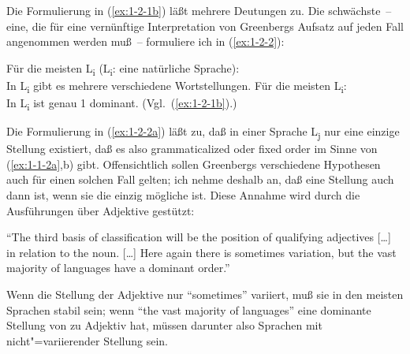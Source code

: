\documentclass[output=paper]{langsci/langscibook}
\begin{document}
Die Formulierung in (\ref{ex:1-2-1b}) läßt mehrere Deutungen zu. Die schwächste~-- eine, die
für eine vernünftige Interpretation von Greenbergs Aufsatz auf jeden Fall angenommen werden muß~– formuliere ich in (\ref{ex:1-2-2}):
\begin{exe}
\ex\label{ex:1-2-2}
\begin{xlist}
\ex\label{ex:1-2-2a} Für die meisten L\textsubscript{i} (L\textsubscript{i}: eine natürliche Sprache): \\
In L\textsubscript{i} gibt es mehrere verschiedene Wortstellungen.
\ex\label{ex:1-2-2b} Für die meisten L\textsubscript{i}: \\
In L\textsubscript{i} ist genau 1  dominant. (Vgl.\ (\ref{ex:1-2-1b}).)
\end{xlist}
\end{exe}
Die Formulierung in (\ref{ex:1-2-2a}) läßt zu, daß in einer Sprache L\textsubscript{j} nur eine einzige Stellung existiert, daß es also grammaticalized oder fixed order im Sinne von (\ref{ex:1-1-2a},b) gibt. Offensichtlich sollen Greenbergs verschiedene Hypothesen auch für einen solchen Fall gelten; ich nehme deshalb an, daß eine Stellung auch dann  ist, wenn sie die
einzig mögliche ist. Diese Annahme wird durch die Ausführungen über Adjektive
gestützt:
\begin{exe}
\ex\label{ex:1-2-3}
"`The third basis of classification will be the position of qualifying adjectives
[\ldots] in relation to the noun. [\ldots] Here again there is sometimes variation, but
the vast majority of languages have a dominant order."' \citep[77]{Greenberg1963}
\end{exe}
Wenn die Stellung der Adjektive nur "`sometimes"' variiert, muß sie in den meisten
Sprachen stabil sein; wenn "`the vast majority of languages"' eine dominante Stellung
von  zu Adjektiv hat, müssen darunter also Sprachen mit nicht"=variierender Stellung sein.
\end{document}
